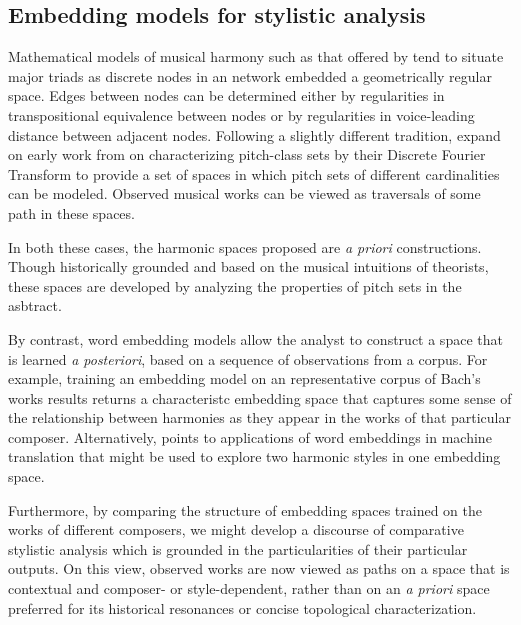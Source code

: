 \subsection{Embedding models for stylistic analysis}
Mathematical models of musical harmony such as that offered by \cite{Callender2008} tend to situate major triads as discrete nodes in an network embedded a geometrically regular space. Edges between nodes can be determined either by regularities in transpositional equivalence between nodes or by regularities in voice-leading distance between adjacent nodes. Following a slightly different tradition, \cite{Quinn2006, Yust2015} expand on early work from \cite{Lewin1959} on characterizing pitch-class sets by their Discrete Fourier Transform to provide a set of spaces in which pitch sets of different cardinalities can be modeled. Observed musical works can be viewed as traversals of some path in these spaces. 

In both these cases, the harmonic spaces proposed are \textit{a priori} constructions. Though historically grounded and based on the musical intuitions of theorists, these spaces are developed by analyzing the properties of pitch sets in the asbtract.

By contrast, word embedding models allow the analyst to construct a space that is learned \textit{a posteriori}, based on a sequence of observations from a corpus. For example, training an embedding model on an representative corpus of Bach's works results returns a characteristc embedding space that captures some sense of the relationship between harmonies as they appear in the works of that particular composer. Alternatively, \cite{Wolf2014} points  to applications of word embeddings in machine translation that might be used to explore two harmonic styles in one embedding space.

Furthermore, by comparing the structure of embedding spaces trained on the works of different composers, we might develop a discourse of comparative stylistic analysis which is grounded in the particularities of their particular outputs. On this view, observed works are now viewed as paths on a space that is contextual and composer- or style-dependent, rather than on an \textit{a priori} space preferred for its historical resonances or concise topological characterization.